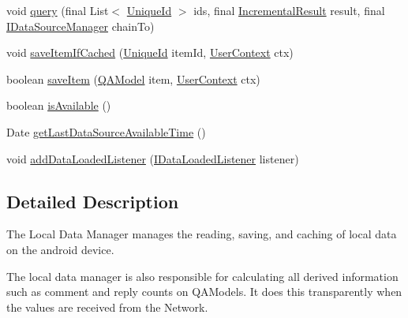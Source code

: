\begin{DoxyCompactItemize}
\item 
void \hyperlink{classcom_1_1ualberta_1_1team17_1_1datamanager_1_1_local_data_manager_abefe19e3bd729c431f53c4ef2f520955}{query} (final List$<$ \hyperlink{classcom_1_1ualberta_1_1team17_1_1_unique_id}{Unique\+Id} $>$ ids, final \hyperlink{classcom_1_1ualberta_1_1team17_1_1datamanager_1_1_incremental_result}{Incremental\+Result} result, final \hyperlink{interfacecom_1_1ualberta_1_1team17_1_1datamanager_1_1_i_data_source_manager}{I\+Data\+Source\+Manager} chain\+To)
\item 
void \hyperlink{classcom_1_1ualberta_1_1team17_1_1datamanager_1_1_local_data_manager_af7219ff5516fe02440e1ea7cd355e1bc}{save\+Item\+If\+Cached} (\hyperlink{classcom_1_1ualberta_1_1team17_1_1_unique_id}{Unique\+Id} item\+Id, \hyperlink{classcom_1_1ualberta_1_1team17_1_1datamanager_1_1_user_context}{User\+Context} ctx)
\item 
boolean \hyperlink{classcom_1_1ualberta_1_1team17_1_1datamanager_1_1_local_data_manager_aa8e5a958332b5c8caf26e17772db1f1b}{save\+Item} (\hyperlink{classcom_1_1ualberta_1_1team17_1_1_q_a_model}{Q\+A\+Model} item, \hyperlink{classcom_1_1ualberta_1_1team17_1_1datamanager_1_1_user_context}{User\+Context} ctx)
\item 
boolean \hyperlink{classcom_1_1ualberta_1_1team17_1_1datamanager_1_1_local_data_manager_a4d3ad2384e8a3211c250bf55e8621f93}{is\+Available} ()
\item 
Date \hyperlink{classcom_1_1ualberta_1_1team17_1_1datamanager_1_1_local_data_manager_a06d5f42586ed5e089f5045b90ccf0781}{get\+Last\+Data\+Source\+Available\+Time} ()
\item 
void \hyperlink{classcom_1_1ualberta_1_1team17_1_1datamanager_1_1_local_data_manager_a26c01549395e5b27b17a205932823cc1}{add\+Data\+Loaded\+Listener} (\hyperlink{interfacecom_1_1ualberta_1_1team17_1_1datamanager_1_1_i_data_loaded_listener}{I\+Data\+Loaded\+Listener} listener)
\end{DoxyCompactItemize}


\subsection{Detailed Description}
The Local Data Manager manages the reading, saving, and caching of local data on the android device.

The local data manager is also responsible for calculating all derived information such as comment and reply counts on Q\+A\+Models. It does this transparently when the values are received from the Network.

